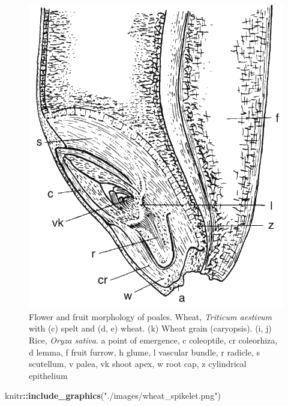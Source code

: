 \documentclass[]{article}
\newenvironment{Shaded}{\begin{snugshade}}{\end{snugshade}}
\newcommand{\KeywordTok}[1]{\textcolor[rgb]{0.13,0.29,0.53}{\textbf{#1}}}
\newcommand{\NormalTok}[1]{#1}
\newcommand{\OperatorTok}[1]{\textcolor[rgb]{0.81,0.36,0.00}{\textbf{#1}}}
\newcommand{\StringTok}[1]{\textcolor[rgb]{0.31,0.60,0.02}{#1}}
\begin{document}
\begin{figure}

{\centering \includegraphics[width=0.8\linewidth]{./images/wheat_kernel} 

}

\caption{Flower and fruit morphology of poales. Wheat, \textit{Triticum aestivum} with (c) spelt and (d, e) wheat. (k) Wheat grain (caryopsis). (i, j) Rice, \textit{Oryza sativa}. a point of emergence, c coleoptile, cr coleorhiza, d lemma, f fruit furrow, h glume, l vascular bundle, r radicle, s scutellum, v palea, vk shoot apex, w root cap, z cylindrical epithelium}\label{fig:floral-morphology-poales}
\end{figure}

\begin{Shaded}
\begin{Highlighting}[]
\NormalTok{knitr}\OperatorTok{::}\KeywordTok{include_graphics}\NormalTok{(}\StringTok{"./images/wheat_spikelet.png"}\NormalTok{)}
\end{Highlighting}
\end{Shaded}
\end{document}
